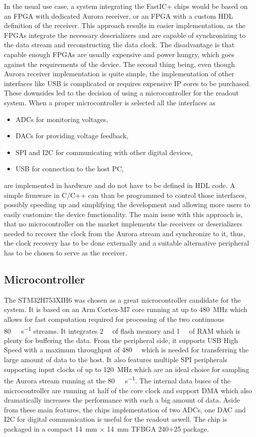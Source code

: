 In the usual use case, a system integrating the FastIC+ chips would be based on an FPGA with dedicated Aurora receiver, or an FPGA with a custom HDL definition of the receiver. This approach results in easier implementation, as the FPGAs integrate the necessary deserializers and are capable of synchronizing to the data stream and reconstructing the data clock. The disadvantage is that capable enough FPGAs are usually expensive and power hungry, which goes against the requirements of the device. The second thing being, even though Aurora receiver implementation is quite simple, the implementation of other interfaces like USB is complicated or requires expensive IP cores to be purchased. These downsides led to the decision of using a microcontroller for the readout system. 
When a proper microcontroller is selected all the interfaces as
\begin{itemize}
    \item ADCs for monitoring voltages,
    \item DACs for providing voltage feedback,
    \item SPI and I2C for communicating with other digital devices,
    \item USB for connection to the host PC,
\end{itemize}
are implemented in hardware and do not have to be defined in HDL code. A simple firmware in C/C++ can than be programmed to control those interfaces, possibly speeding up and simplifying the development and allowing more users to easily customize the device functionality. The main issue with this approach is, that no microcontroller on the market implements the receivers or deserializers needed to recover the clock from the Aurora stream and synchronize to it, thus, the clock recovery has to be done externally and a suitable alternative peripheral has to be chosen to serve as the receiver.

\subsection{Microcontroller}
The STM32H753XIH6 was chosen as a great microcontroller candidate for the system. It is based on an Arm Cortex-M7 core running at up to \SI{480}{\mega\hertz} which allows for fast computation required for processing of the two continuous \SI{80}{\mega\bit\per\second} streams. It integrates \SI{2}{\mega\byte} of flash memory and \SI{1}{\mega\byte} of RAM which is plenty for buffering the data. From the peripheral side, it supports USB High Speed with a maximum throughput of \SI{480}{\mega\bit} which is needed for transferring the large amount of data to the host. It also features multiple SPI peripherals supporting input clocks of up to \SI{120}{\mega\hertz} which are an ideal choice for sampling the Aurora stream running at the \SI{80}{\mega\bit\per\second}. The internal data buses of the microcontroller are running at half of the core clock and support DMA which also dramatically increases the performance with such a big amount of data. Aside from these main features, the chips implementation of two ADCs, one DAC and I2C for digital communication is useful for the readout aswell. The chip is packaged in a compact \SI{14}{\milli\meter} $\times$ \SI{14}{\milli\meter} TFBGA 240+25 package.

